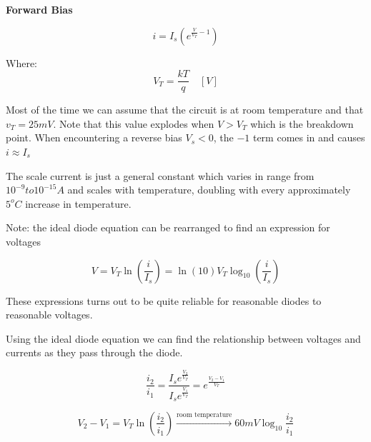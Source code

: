 \documentclass[10pt]{article}
\begin{document}
\begin{theorem}
	\textbf{Forward Bias} 

	\begin{equation}
		i = I_s(e^{\frac{V}{V_T} - 1})
		\label{eq:360:forward_bias}
	\end{equation}

	Where:
	\begin{equation}
		V_T = \frac{kT}{q} \quad [V]
	\end{equation}

	Most of the time we can assume that the circuit is at room temperature and that $ v_T = 25mV $.
	Note that this value explodes when $ V > V_T  $ which is the breakdown point.
	When encountering a reverse bias $ V_s < 0 $, the $ -1 $ term comes in and causes $ i \approx I_s  $  

	The scale current is just a general constant which varies in range from $ 10^{-9} to 10^{-15} A $ and scales with temperature, doubling with every approximately $ 5^o C $ increase in temperature.





	Note: the ideal diode equation can be rearranged to find an expression for voltages

	\begin{equation}
		V = V_T \ln{(\frac{i}{I_s}) = \ln{(10)} V_T \log_{10}{(\frac{i}{I_s})}}
		\label{eq:360:forward_bias_v}
	\end{equation}

	These expressions turns out to be quite reliable for reasonable diodes to reasonable voltages.

\end{theorem}

Using the ideal diode equation we can find the relationship between voltages and currents as they pass through the diode.


\begin{equation}
	\frac{i_2}{i_1} = \frac{I_s e^{\frac{V_2}{V_T}}}{I_s e^{\frac{V_1}{V_T}}} = e^{\frac{V_2 - V_1}{V_T}}
\end{equation}


\begin{equation}
	V_2 - V_1 = V_T \ln{(\frac{i_2}{i_1})} \xrightarrow{\text{room temperature}} 60mV \log_{10} \frac{i_2}{i_1}
\end{equation}
\end{document}
